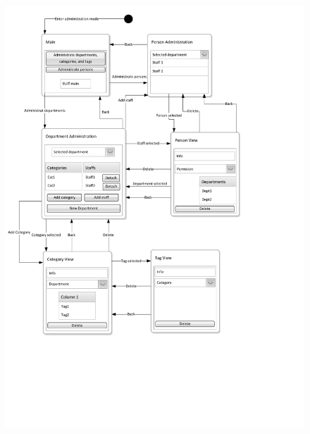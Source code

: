 \begin{figure}[H]
	\centering
		\includegraphics[width = \textwidth, clip=true, trim=0 5cm 3cm 0]{input/application_domain_analysis/Navigation_DiagramAdmin.pdf}
	\morscaption{\ainterface[c]}
	\label{fig:Navigation_DiagramAdmin}
\end{figure}

